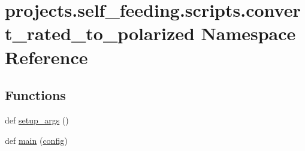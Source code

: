 \hypertarget{namespaceprojects_1_1self__feeding_1_1scripts_1_1convert__rated__to__polarized}{}\section{projects.\+self\+\_\+feeding.\+scripts.\+convert\+\_\+rated\+\_\+to\+\_\+polarized Namespace Reference}
\label{namespaceprojects_1_1self__feeding_1_1scripts_1_1convert__rated__to__polarized}
\subsection*{Functions}
\begin{DoxyCompactItemize}
\item 
def \hyperlink{namespaceprojects_1_1self__feeding_1_1scripts_1_1convert__rated__to__polarized_acba2c1088cdc95f703203c9166b9499d}{setup\+\_\+args} ()
\item 
def \hyperlink{namespaceprojects_1_1self__feeding_1_1scripts_1_1convert__rated__to__polarized_abb1b1c7522da8d4703fc74cdb6422d87}{main} (\hyperlink{namespaceprojects_1_1self__feeding_1_1scripts_1_1convert__rated__to__polarized_aeadc1d5335ee2fb1b0c70decb82bc14f}{config})
\end{DoxyCompactItemize}
